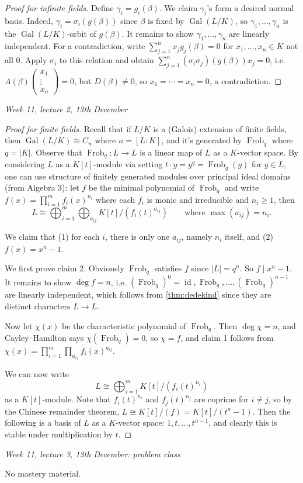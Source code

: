\documentclass{article}
\newcommand{\id}{\operatorname{id}}
\newcommand{\Gal}{\operatorname{Gal}}
\newcommand{\Frob}{\operatorname{Frob}}
\theoremstyle{definition}
\begin{document}
\begin{proof}[Proof for infinite fields]
Define $\gamma_i=g_i(\beta)$. We claim $\gamma_i$'s form a desired normal basis. Indeed, $\gamma_i=\sigma_i(g(\beta)) $ since $\beta$ is fixed by $\Gal(L/K)$, so $\gamma_1,\ldots,\gamma_n$ is the $\Gal(L/K)$-orbit of $g(\beta)$. It remains to show $\gamma_1,\ldots,\gamma_n$ are linearly independent. For a contradiction, write $\sum_{j=1}^n x_jg_j(\beta)=0$ for $x_1,\ldots,x_n\in K$ not all 0. Apply $\sigma_i$ to this relation and obtain $\sum_{j=1}^n(\sigma_i\sigma_j)(g(\beta))x_j=0$, i.e. $A(\beta)\begin{pmatrix}
x_1 \\ \vdots \\ x_n
\end{pmatrix}=0$, but $D(\beta)\neq 0$, so $x_1=\cdots=x_n=0$, a contradiction.
\end{proof}

\begin{flushright}
\textit{Week 11, lecture 2, 13th December}
\end{flushright}

\begin{proof}[Proof for finite fields]
Recall that if $L/K$ is a (Galois) extension of finite fields, then $\Gal(L/K)\cong C_n$ where $n=[L:K]$, and it's generated by $\Frob_q$ where $q=|K|$. Observe that $\Frob_q:L\rightarrow L$ is a linear map of $L$ as a $K$-vector space. By considering $L$ as a $K[t]$-module via setting $t\cdot y=y^q=\Frob_q(y)$ for $y\in L$, one can use structure of finitely generated modules over principal ideal domains (from Algebra 3): let $f$ be the minimal polynomial of $\Frob_q$ and write $f(x)=\prod_{i=1}^m f_i(x)^{n_i}$ where each $f_i$ is monic and irreducible and $n_i\geq 1$, then
\[
L\cong \bigoplus_{i=1}^m \bigoplus_{a_{ij}} K[t]/(f_i(t)^{a_{ij}})\qquad\text{where }\max(a_{ij})=n_i.
\]

We claim that (1) for each $i$, there is only one $a_{ij}$, namely $n_i$ itself, and (2) $f(x)=x^n-1$.

We first prove claim 2. Obviously $\Frob_q$ satisfies $f$ since $|L|=q^n$. So $f\mid x^n-1$. It remains to show $\deg f=n$, i.e. $(\Frob_q)^0=\id,\Frob_q,\ldots,(\Frob_q)^{n-1}$ are linearly independent, which follows from \ref{thm:dedekind} since they are distinct characters $L\rightarrow L$.

Now let $\chi(x)$ be the characteristic polynomial of $\Frob_q$. Then $\deg\chi=n$, and Cayley--Hamilton says $\chi(\Frob_q)=0$, so $\chi=f$, and claim 1 follows from $\chi(x)=\prod_{i=1}^m\prod_{a_{ij}}f_i(x)^{a_{ij}}$.

We can now write
\[
L\cong\bigoplus_{i=1}^m K[t]/(f_i(t)^{n_i})
\]
as a $K[t]$-module. Note that $f_i(t)^{n_i}$ and $f_j(t)^{n_j}$ are coprime for $i\neq j$, so by the Chinese remainder theorem, $L\cong K[t]/(f)=K[t]/(t^n-1)$. Then the following is a basis of $L$ as a $K$-vector space: $1,t,\ldots,t^{n-1}$, and clearly this is stable under multiplication by $t$.
\end{proof}

\begin{flushright}
\textit{Week 11, lecture 3, 13th December: problem class}
\end{flushright}

No mastery material.
\end{document}
